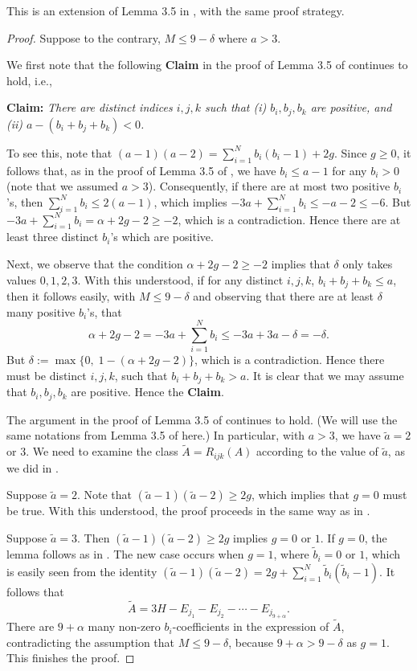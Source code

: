 \documentclass[11pt]{amsart}
\theoremstyle{plain}
\numberwithin{theorem}{section}
\theoremstyle{definition}
\begin{document}
This is an extension of Lemma 3.5 in \cite{C}, with the same proof strategy.

\begin{proof}
Suppose to the contrary, $M\leq 9-\delta$ where $a>3$.

We first note that the following {\bf Claim} in the proof of Lemma 3.5 of \cite{C} continues to hold, i.e., 

\vspace{1mm}

{\bf Claim:} {\it There are distinct indices $i,j,k$ such that (i) $b_i,b_j,b_k$ are positive, and (ii) $a-(b_i+b_j+b_k)<0$.
}


\vspace{1mm}

To see this, note that $(a-1)(a-2)=\sum_{i=1}^N b_i(b_i-1)+2g$. Since $g\geq 0$, it follows that, as in the proof of
Lemma 3.5 of \cite{C}, we have $b_i\leq a-1$ for any $b_i>0$ (note that we assumed $a>3$). Consequently, if there are at most two
positive $b_i$'s, then $\sum_{i=1}^N b_i\leq 2(a-1)$, which implies $-3a+\sum_{i=1}^N b_i\leq -a-2\leq -6$. But $-3a+\sum_{i=1}^N b_i=\alpha+2g-2\geq -2$, which is a contradiction. Hence there are at least three distinct 
$b_i$'s which are positive.

Next, we observe that the condition $\alpha+2g-2\geq -2$ implies that $\delta$ only takes values 
$0,1,2,3$. With this understood, if for any distinct $i,j,k$, $b_i+b_j+b_k\leq a$, then it follows easily, 
with $M\leq 9-\delta$ and observing that there are at least $\delta$ many positive $b_i$'s, that
$$
\alpha+2g-2=-3a+\sum_{i=1}^N b_i\leq -3a+3a-\delta=-\delta.
$$
But $\delta:=\max \{0, \; 1-(\alpha+2g-2)\}$, which is a contradiction. Hence there must be distinct $i,j,k$, such that $b_i+b_j+b_k> a$. It is clear that we may assume that $b_i,b_j,b_k$ are positive. Hence the {\bf Claim}. 

The argument in the proof of Lemma 3.5 of \cite{C} continues to hold. (We will use the same notations from 
Lemma 3.5 of \cite{C} here.) In particular, with $a>3$, we have $\tilde{a}=2$ or $3$. We need to examine the class 
$\tilde{A}=R_{ijk}(A)$ according to the value of $\tilde{a}$, as we did in \cite{C}. 

Suppose $\tilde{a}=2$. Note that $(\tilde{a}-1)(\tilde{a}-2)\geq 2g$, which implies that $g=0$ must be true. With this understood, the proof proceeds in the same way as in \cite{C}. 

Suppose $\tilde{a}=3$. Then $(\tilde{a}-1)(\tilde{a}-2)\geq 2g$ implies $g=0$ or $1$. If $g=0$, the lemma follows as in \cite{C}. The new case occurs when $g=1$, where $\tilde{b}_i=0$ or $1$, which is easily seen from the identity $(\tilde{a}-1)(\tilde{a}-2)=2g+\sum_{i=1}^N \tilde{b}_i(\tilde{b}_i-1)$. It follows that
$$
\tilde{A}=3H-E_{j_1}-E_{j_2}-\cdots-E_{j_{9+\alpha}}.
$$
There are $9+\alpha$ many non-zero $b_i$-coefficients in the expression of $\tilde{A}$, contradicting the assumption that $M\leq 9-\delta$, because $9+\alpha>9-\delta$ as $g=1$. This finishes the proof. 

\end{proof}
\end{document}
